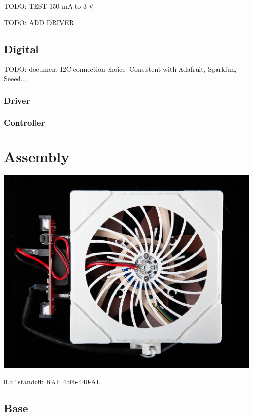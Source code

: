 \documentclass[11pt]{article}
\let\stdsection\section
\renewcommand\section{\clearpage\stdsection}
\begin{document}
TODO: TEST
150 mA to 3 V

TODO: ADD DRIVER



\subsection{Digital}

TODO: document I2C connection choice.
Consistent with Adafruit, Sparkfun, Seeed...

\subsubsection{Driver}



\subsubsection{Controller}

\section{Assembly}

\includegraphics[width=\textwidth]{"./assembly-coverart.jpg"}

0.5'' standoff: RAF 4505-440-AL

\subsection{Base}
\end{document}
